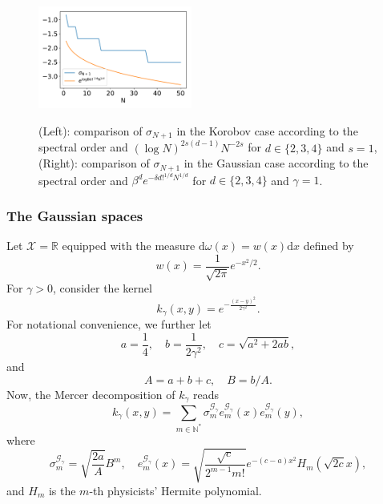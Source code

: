 \documentclass[twoside,11pt]{book}
\numberwithin{theorem}{chapter}
\numberwithin{definition}{chapter}
\numberwithin{proposition}{chapter}
\numberwithin{corollary}{chapter}
\numberwithin{example}{chapter}
\numberwithin{lemma}{chapter}
\numberwithin{assumption}{chapter}
\numberwithin{equation}{chapter}
\numberwithin{figure}{chapter}
\begin{document}
\begin{figure}[]
\includegraphics[width= 0.45\textwidth]{img/neurips/multiHermite/comparison/Gaussian_4D_scale_1_eig_comparison.pdf}
\\
\caption{(Left): comparison of $\sigma_{N+1}$ in the Korobov case according to the spectral order and $(\log N)^{2s(d-1)}N^{-2s}$ for $d \in \{2,3,4\}$ and $s=1$, (Right): comparison of $\sigma_{N+1}$ in the Gaussian case according to the spectral order and $\beta^{d}e^{-\delta d!^{1/d}N^{1/d}}$ for $d \in \{2,3,4\}$ and $\gamma = 1$.}
\label{f:rates}
\end{figure}



\subsubsection{The Gaussian spaces}\label{sec:dppkq_gaussian_space_def}
Let $\mathcal{X} = \mathbb{R}$ equipped with the measure $\mathrm{d} \omega(x) = w(x) \mathrm{d}x$ defined by
\begin{equation}
w(x) = \frac{1}{\sqrt{2 \pi} }e^{-x^{2}/2}.
\end{equation}
For $\gamma >0$, consider the kernel
\begin{equation}
k_{\gamma}(x,y) = e^{-\frac{(x-y)^{2}}{2\gamma^{2}}}.
\end{equation}
For notational convenience, we further let
\begin{equation}
a = \frac{1}{4}, \quad b = \frac{1}{2 \gamma^{2}}, \quad c = \sqrt{a^{2} + 2ab},
\end{equation}
and
\begin{equation}
A = a + b + c,  \quad B = b/A.
\end{equation}
Now, the Mercer decomposition of $k_{\gamma}$ reads \cite{Ras03}
\begin{equation}
k_{\gamma}(x,y) = \sum\limits_{m \in \mathbb{N}^{*}} \sigma_{m}^{\mathcal{G}_{\gamma}}e_{m}^{\mathcal{G}_{\gamma}}(x)e_{m}^{\mathcal{G}_{\gamma}}(y),
\end{equation}
where
\begin{equation}
\sigma_{m}^{\mathcal{G}_{\gamma}} = \sqrt{\frac{2a}{A}} B^{m}, \quad e_{m}^{\mathcal{G}_{\gamma}}(x) = \sqrt{\frac{\sqrt{c}}{2^{m-1}m!}}e^{-(c-a)x^{2}}H_{m}(\sqrt{2c}x),
\end{equation}
and $H_{m}$ is the $m$-th physicists' Hermite polynomial. 
\end{document}
